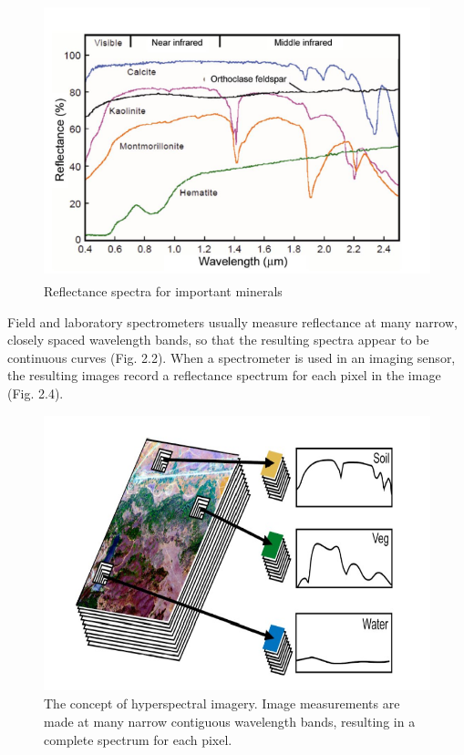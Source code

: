 \documentclass[document.tex]{subfiles}
\begin{document}
\begin{figure}[H]
	\begin{center}
		\includegraphics[height=8.0cm]{imgs/Minerals.png}
	\end{center}
	\caption{Reflectance spectra for important minerals}
	\label{fig: Reflectance spectra for important minerals}
\end{figure}
\noindent Field and laboratory spectrometers usually measure reflectance at many narrow,
closely spaced wavelength bands, so that the resulting spectra appear to be continuous curves (Fig. 2.2). When a spectrometer is used in an imaging sensor, the resulting
images record a reflectance spectrum for each pixel in the image (Fig. 2.4).
\begin{figure}[H]
	\begin{center}
		\includegraphics[height=8.0cm]{imgs/Hyperspectral_imagery.png}
	\end{center}
	\caption{The concept of hyperspectral imagery. Image measurements are made at
		many narrow contiguous wavelength bands, resulting in a complete spectrum for each
		pixel.}
	\label{fig: Hyperspectral imagery}
\end{figure}
\end{document}
